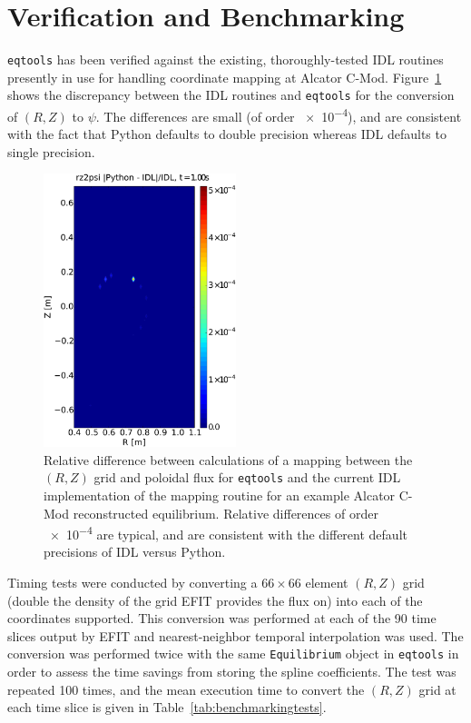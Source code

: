 \documentclass[12pt,floatfix,showpacs]{revtex4-1}
\newcommand{\eqtools}{\texttt{eqtools}\xspace}
\begin{document}
\section{Verification and Benchmarking}\label{sec:benchmark}
\eqtools has been verified against the existing, thoroughly-tested IDL routines presently in use for handling coordinate mapping at Alcator C-Mod.
Figure~\ref{fig:rz2psi_diff} shows the discrepancy between the IDL routines and \eqtools for the conversion of $(R, Z)$ to $\psi$.
The differences are small (of order \num{e-4}), and are consistent with the fact that Python defaults to double precision whereas IDL defaults to single precision.
\begin{figure}
	\includegraphics[width=0.5\textwidth]{graphics/rz2psi}
	\caption{Relative difference between calculations of a mapping between the $(R, Z)$ grid and poloidal flux for \eqtools and the current IDL implementation of the mapping routine for an example Alcator C-Mod reconstructed equilibrium.  Relative differences of order \num{e-4} are typical, and are consistent with the different default precisions of IDL versus Python.}
	\label{fig:rz2psi_diff}
\end{figure}
Timing tests were conducted by converting a $66\times66$ element $(R, Z)$ grid (double the density of the grid EFIT provides the flux on) into each of the coordinates supported.
This conversion was performed at each of the 90 time slices output by EFIT and nearest-neighbor temporal interpolation was used.
The conversion was performed twice with the same \verb|Equilibrium| object in \eqtools in order to assess the time savings from storing the spline coefficients.
The test was repeated 100 times, and the mean execution time to convert the $(R, Z)$ grid at each time slice is given in Table~\ref{tab:benchmarkingtests}.
\end{document}
